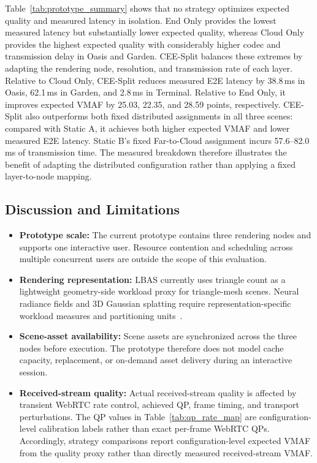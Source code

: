 \documentclass[10pt,journal,compsoc]{IEEEtran}
\begin{document}
Table~\ref{tab:prototype_summary} shows that no strategy optimizes expected quality and measured latency in isolation. End Only provides the lowest measured latency but substantially lower expected quality, whereas Cloud Only provides the highest expected quality with considerably higher codec and transmission delay in Oasis and Garden. CEE-Split balances these extremes by adapting the rendering node, resolution, and transmission rate of each layer. Relative to Cloud Only, CEE-Split reduces measured E2E latency by 38.8\,ms in Oasis, 62.1\,ms in Garden, and 2.8\,ms in Terminal. Relative to End Only, it improves expected VMAF by 25.03, 22.35, and 28.59 points, respectively. CEE-Split also outperforms both fixed distributed assignments in all three scenes: compared with Static A, it achieves both higher expected VMAF and lower measured E2E latency. Static B's fixed Far-to-Cloud assignment incurs 57.6--82.0\,ms of transmission time. The measured breakdown therefore illustrates the benefit of adapting the distributed configuration rather than applying a fixed layer-to-node mapping.

\subsection{Discussion and Limitations}

\begin{itemize}
	\item \textbf{Prototype scale:} The current prototype contains three rendering nodes and supports one interactive user. Resource contention and scheduling across multiple concurrent users are outside the scope of this evaluation.
	
	\item \textbf{Rendering representation:} LBAS currently uses triangle count as a lightweight geometry-side workload proxy for triangle-mesh scenes. Neural radiance fields and 3D Gaussian splatting require representation-specific workload measures and partitioning units~\cite{wu_embracing_2024,zhu_nebula_2025}.

	\item \textbf{Scene-asset availability:} Scene assets are synchronized across the three nodes before execution. The prototype therefore does not model cache capacity, replacement, or on-demand asset delivery during an interactive session.

	\item \textbf{Received-stream quality:} Actual received-stream quality is affected by transient WebRTC rate control, achieved QP, frame timing, and transport perturbations. The QP values in Table~\ref{tab:qp_rate_map} are configuration-level calibration labels rather than exact per-frame WebRTC QPs. Accordingly, strategy comparisons report configuration-level expected VMAF from the quality proxy rather than directly measured received-stream VMAF.
\end{itemize}
\end{document}
